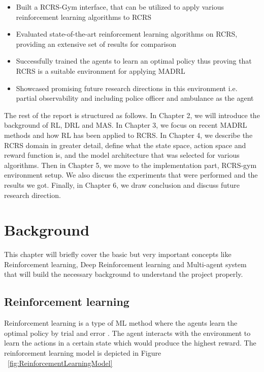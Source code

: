 \documentclass[12pt]{report}
\begin{document}
\begin{itemize}
    \item Built a RCRS-Gym interface, that can be utilized to apply various reinforcement learning algorithms to RCRS
    \item Evaluated state-of-the-art reinforcement learning algorithms on RCRS, providing an extensive set of results for comparison
    \item Successfully trained the agents to learn an optimal policy thus proving that RCRS is a suitable environment for applying MADRL 
    \item Showcased promising future research directions in this environment i.e. partial observability and including police officer and ambulance as the agent
\end{itemize}

The rest of the report is structured as follows. In Chapter 2, we will introduce the background of RL, DRL and MAS. In Chapter 3, we focus on recent MADRL methods and how RL has been applied to RCRS. In Chapter 4, we describe the RCRS domain in greater detail, define what the state space, action space and reward function is, and the model architecture that was selected for various algorithms. Then in Chapter 5, we move to the implementation part, RCRS-gym environment setup. We also discuss the experiments that were performed and the results we got. Finally, in Chapter 6, we draw conclusion and discuss future research direction. 

\chapter{Background}                       

This chapter will briefly cover the basic but very important concepts like Reinforcement learning, Deep Reinforcement learning and Multi-agent system that will build the necessary background to understand the project properly.  

\section{Reinforcement learning}

Reinforcement learning is a type of ML method where the agents learn the optimal policy by trial and error \cite{Barto}. The agent interacts with the environment to learn the actions in a certain state which would produce the highest reward. The reinforcement learning model is depicted in Figure ~\ref{fig:ReinforcementLearningModel} 
\end{document}
